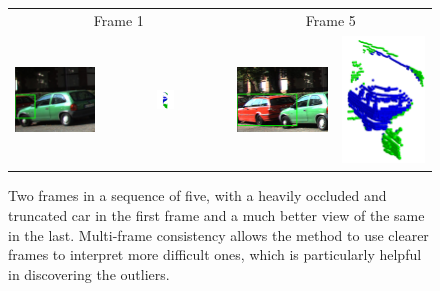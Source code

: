 \begin{figure}
    \centering
    \begin{tabular}{c c | c c}
        \multicolumn{2}{c}{Frame 1} & \multicolumn{2}{c}{Frame 5} \\
         \includegraphics[height=0.16\textwidth]{figures/method/multiframe/ex3/rgb-1.png}
        &\includegraphics[width=0.15\textwidth]{figures/method/multiframe/ex3/pcd-1.png} &
         \includegraphics[height=0.16\textwidth]{figures/method/multiframe/ex3/rgb-5.png}
        &\includegraphics[height=0.2\textwidth]{figures/method/multiframe/ex3/pcd-5.png} \\
    \end{tabular}
    \caption{Two frames in a sequence of five, with a heavily occluded and truncated car in the first frame and a much better view of the same in the last.
    Multi-frame consistency allows the method to use clearer frames to interpret more difficult ones, which is particularly helpful in discovering the outliers.}\label{fig:multiframe_example}
\end{figure}